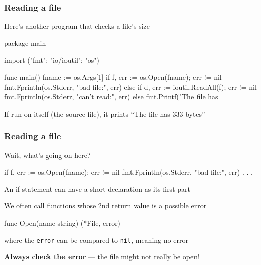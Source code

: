 \documentclass[handout,compress,t,11pt]{beamer}
\begin{document}
\begin{frame}[fragile]
    \frametitle{Reading a file}
    Here's another program that checks a file's size
\begin{golang}
package main

import ("fmt"; "io/ioutil"; "os")

func main() {
    fname := os.Args[1]
    if f, err := os.Open(fname); err != nil {
        fmt.Fprintln(os.Stderr, "bad file:", err)
    } else if d, err := ioutil.ReadAll(f); err != nil {
        fmt.Fprintln(os.Stderr, "can't read:", err)
    } else {
        fmt.Printf("The file has %
    }
}
\end{golang}
If run on itself (the source file), it prints ``The file has 333 bytes''
\end{frame}

\begin{frame}[fragile]
    \frametitle{Reading a file}
    Wait, what's going on here?
\begin{golang}
if f, err := os.Open(fname); err != nil {
    fmt.Fprintln(os.Stderr, "bad file:", err)
} . . .
\end{golang}
    \vspace{0.5\baselineskip}
An if-statement can have a short declaration as its first part \par
    \vspace{\baselineskip}
We often call functions whose 2nd return value is a possible error \par
\begin{golang}
    func Open(name string) (*File, error)
\end{golang}
where the \verb|error| can be compared to \verb|nil|, meaning no error \par
    \vspace{\baselineskip}
\alert{\bf Always check the error} --- the file might not really be open! \par
\end{frame}


\end{document}
